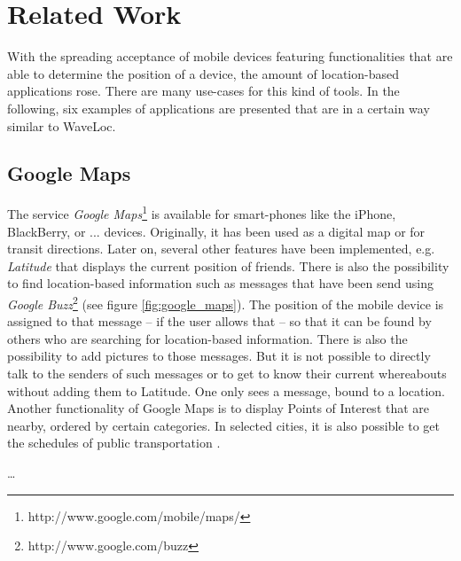 \chapter{Related Work}
\label{cha:related_work}

With the spreading acceptance of mobile devices \cite{Mawston} featuring functionalities that are able to determine the position of a device, the amount of location-based applications rose. There are many use-cases for this kind of tools. In the following, six examples of applications are presented that are in a certain way similar to WaveLoc.


\section{Google Maps}

The service \emph{Google Maps}\footnote{http://www.google.com/mobile/maps/} is available for smart-phones like the iPhone, BlackBerry, or ... devices. Originally, it has been used as a digital map or for transit directions. Later on, several other features have been implemented, e.g. \emph{Latitude} that displays the current position of friends. There is also the possibility to find location-based information such as messages that have been send using \emph{Google Buzz}\footnote{http://www.google.com/buzz} (see figure \ref{fig:google_maps}). The position of the mobile device is assigned to that message -- if the user allows that -- so that it can be found by others who are searching for location-based information. There is also the possibility to add pictures to those messages. But it is not possible to directly talk to the senders of such messages or to get to know their current whereabouts without adding them to Latitude. One only sees a message, bound to a location. Another functionality of Google Maps is to display Points of Interest that are nearby, ordered by certain categories. In selected cities, it is also possible to get the schedules of public transportation \cite{googletransit}.

\ldots{}